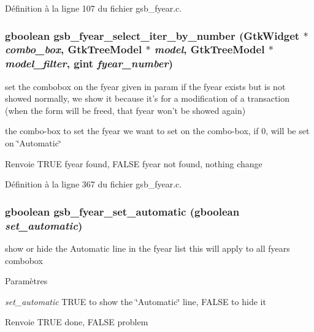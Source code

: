 Définition à la ligne 107 du fichier gsb\_\-fyear.c.

\subsubsection[{gsb\_\-fyear\_\-select\_\-iter\_\-by\_\-number}]{\setlength{\rightskip}{0pt plus 5cm}gboolean gsb\_\-fyear\_\-select\_\-iter\_\-by\_\-number (GtkWidget $\ast$ {\em combo\_\-box}, \/  GtkTreeModel $\ast$ {\em model}, \/  GtkTreeModel $\ast$ {\em model\_\-filter}, \/  gint {\em fyear\_\-number})}\label{gsb__fyear_8h_a0e0eb0128f2cec486a664a028b70a273}
set the combobox on the fyear given in param if the fyear exists but is not showed normally, we show it because it's for a modification of a transaction (when the form will be freed, that fyear won't be showed again)

the combo-\/box to set    the fyear we want to set on the combo-\/box, if 0, will be set on \char`\"{}Automatic\char`\"{}

\begin{DoxyReturn}{Renvoie}
TRUE fyear found, FALSE fyear not found, nothing change 
\end{DoxyReturn}


Définition à la ligne 367 du fichier gsb\_\-fyear.c.

\subsubsection[{gsb\_\-fyear\_\-set\_\-automatic}]{\setlength{\rightskip}{0pt plus 5cm}gboolean gsb\_\-fyear\_\-set\_\-automatic (gboolean {\em set\_\-automatic})}\label{gsb__fyear_8h_a0b7a0d85ac5432e1a72a33493fce76d7}
show or hide the Automatic line in the fyear list this will apply to all fyears combobox


\begin{DoxyParams}{Paramètres}
\item[{\em set\_\-automatic}]TRUE to show the \char`\"{}Automatic\char`\"{} line, FALSE to hide it\end{DoxyParams}
\begin{DoxyReturn}{Renvoie}
TRUE done, FALSE problem 
\end{DoxyReturn}


